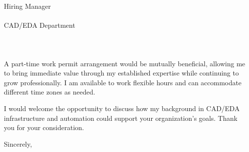 \documentclass[11pt,a4paper]{letter}
\begin{document}
\begin{letter}{
    Hiring Manager\\\\
    CAD/EDA Department\\\\
    [Company Name]\\\\
    [Company Address]
}
A part-time work permit arrangement would be mutually beneficial, allowing me to bring immediate value through my established expertise while continuing to grow professionally. I am available to work flexible hours and can accommodate different time zones as needed.

I would welcome the opportunity to discuss how my background in CAD/EDA infrastructure and automation could support your organization's goals. Thank you for your consideration.

\closing{Sincerely,}

\end{letter}
\end{document}
